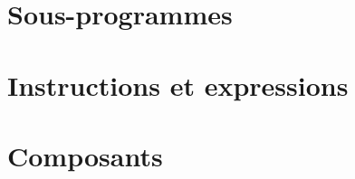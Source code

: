 \documentclass [a4paper, 11pt] {book}
\begin{document}
\part{Sous-programmes}



\part{Instructions et expressions}





\part{Composants}

















\cleardoublepage %

{\small
\printindex
}

\end{document}
